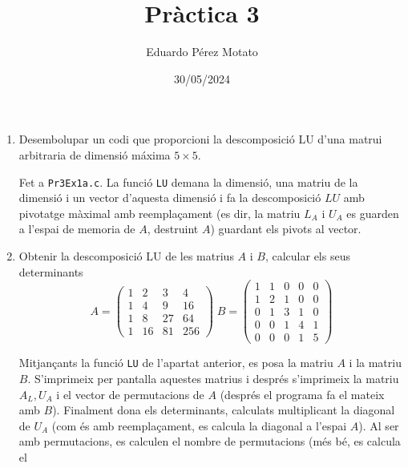 \documentclass[a4paper, 12pt]{article}
\title{Pràctica 3}
\author{Eduardo Pérez Motato}
\date{30/05/2024}
\begin{document}
    \makeheader

    \begin{exercici}
        \begin{enumerate}[label=\alph*)]
            \item Desembolupar un codi que proporcioni la descomposició LU d'una matrui arbitraria
            de dimensió máxima $5\times5$.\\
            \begin{solucio}
                Fet a \verb|Pr3Ex1a.c|. La funció \verb|LU| demana la dimensió, una matriu de la
                dimensió i un vector d'aquesta dimensió i fa la descomposició $LU$ amb pivotatge
                màximal amb reemplaçament (es dir, la matriu $L_A$ i $U_A$ es guarden a l'espai de
                memoria de $A$, destruint $A$) guardant els pivots al vector.
            \end{solucio}
            \item Obtenir la descomposició LU de les matrius $A$ i $B$, calcular els seus
            determinants
            $$
            A = \begin{pmatrix}
                1 & 2 & 3 & 4\\
                1 & 4 & 9 & 16\\
                1 & 8 & 27 & 64\\
                1 & 16 & 81 & 256
            \end{pmatrix}
            \;
            B = \begin{pmatrix}
                1 & 1 & 0 & 0 & 0\\
                1 & 2 & 1 & 0 & 0\\
                0 & 1 & 3 & 1 & 0\\
                0 & 0 & 1 & 4 & 1\\
                0 & 0 & 0 & 1 & 5
            \end{pmatrix}
            $$
            \begin{solucio}
                Mitjançants la funció \verb|LU| de l'apartat anterior, es posa la matriu $A$ i la
                matriu $B$. S'imprimeix per pantalla aquestes matrius i després s'imprimeix la
                matriu $A_L, U_A$ i el vector de permutacions de $A$ (després el programa fa el
                mateix amb $B$). Finalment dona els determinants, calculats multiplicant la diagonal
                de $U_A$ (com és amb reemplaçament, es calcula la diagonal a l'espai $A$). Al ser
                amb permutacions, es calculen el nombre de permutacions (més bé, es calcula el

\end{solucio}
\end{enumerate}
\end{exercici}
\end{document}

